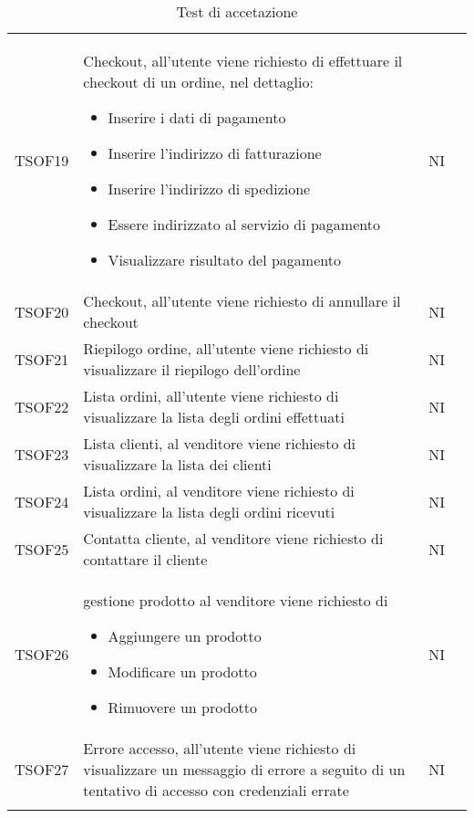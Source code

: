 \begin{center}
\begin{longtable}[!h]{p{50px} p{245px} p{75px} p{50px}}
        TSOF19  & Checkout, all'utente viene richiesto di effettuare il checkout di un ordine, nel dettaglio: \begin{itemize} \item Inserire i dati di pagamento \item Inserire l'indirizzo di fatturazione \item Inserire l'indirizzo di spedizione \item Essere indirizzato al servizio di pagamento \item Visualizzare risultato del pagamento \end{itemize} & NI \\
        TSOF20  & Checkout, all'utente viene richiesto di annullare il checkout & NI \\
        TSOF21  & Riepilogo ordine, all'utente viene richiesto di visualizzare il riepilogo dell'ordine & NI \\
        TSOF22  & Lista ordini, all'utente viene richiesto di visualizzare la lista degli ordini effettuati  & NI \\
        TSOF23  & Lista clienti, al venditore viene richiesto di visualizzare la lista dei clienti & NI \\
        TSOF24  & Lista ordini, al venditore viene richiesto di visualizzare la lista degli ordini ricevuti & NI \\
        TSOF25  & Contatta cliente, al venditore viene richiesto di contattare il cliente & NI \\
        TSOF26  & gestione prodotto al venditore viene richiesto di \begin{itemize} \item Aggiungere un prodotto \item Modificare un prodotto \item Rimuovere un prodotto \end{itemize} & NI \\
        TSOF27  & Errore accesso, all'utente viene richiesto di visualizzare un messaggio di errore a seguito di un tentativo di accesso con credenziali errate & NI \\
        \rowcolor{white}\caption{Test di accetazione}            
    \end{longtable}    
\end{center}